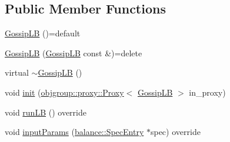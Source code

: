 \subsection*{Public Member Functions}
\begin{DoxyCompactItemize}
\item 
\hyperlink{structvt_1_1vrt_1_1collection_1_1lb_1_1_gossip_l_b_a76e6ae6cec011c88a60327b4d7b590eb}{Gossip\+LB} ()=default
\item 
\hyperlink{structvt_1_1vrt_1_1collection_1_1lb_1_1_gossip_l_b_a2b970a7f33caac706c6702145856fda1}{Gossip\+LB} (\hyperlink{structvt_1_1vrt_1_1collection_1_1lb_1_1_gossip_l_b}{Gossip\+LB} const \&)=delete
\item 
virtual \hyperlink{structvt_1_1vrt_1_1collection_1_1lb_1_1_gossip_l_b_a9fe91a1a0a7009daf87dc09786639401}{$\sim$\+Gossip\+LB} ()
\item 
void \hyperlink{structvt_1_1vrt_1_1collection_1_1lb_1_1_gossip_l_b_a42ceee5620c3035d19a410afc9e3ef24}{init} (\hyperlink{structvt_1_1objgroup_1_1proxy_1_1_proxy}{objgroup\+::proxy\+::\+Proxy}$<$ \hyperlink{structvt_1_1vrt_1_1collection_1_1lb_1_1_gossip_l_b}{Gossip\+LB} $>$ in\+\_\+proxy)
\item 
void \hyperlink{structvt_1_1vrt_1_1collection_1_1lb_1_1_gossip_l_b_a06116496c3146be18c56379775f8715d}{run\+LB} () override
\item 
void \hyperlink{structvt_1_1vrt_1_1collection_1_1lb_1_1_gossip_l_b_abc000890ad1743faae2fe853d73485bb}{input\+Params} (\hyperlink{structvt_1_1vrt_1_1collection_1_1balance_1_1_spec_entry}{balance\+::\+Spec\+Entry} $\ast$spec) override
\end{DoxyCompactItemize}
